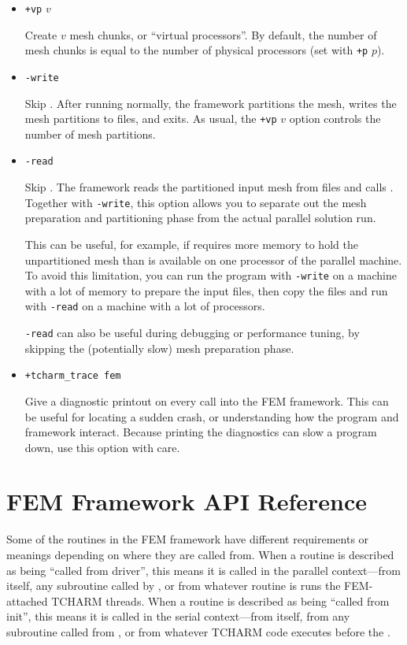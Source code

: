 \documentclass[10pt]{article}
\begin{document}
\begin{itemize}
\item {\tt +vp} $v$  

Create $v$ mesh chunks, or ``virtual processors''.
By default, the number of mesh chunks is equal to the number of 
physical processors (set with {\tt +p} $p$).


\item {\tt -write}

Skip .
After running  normally, the framework partitions the mesh, 
writes the mesh partitions to files, and exits.  As usual, the
{\tt +vp} $v$ option controls the number of mesh partitions.


\item {\tt -read}

Skip .
The framework reads the partitioned input mesh from files
and calls .  Together with {\tt -write}, this option
allows you to separate out the mesh preparation and partitioning 
phase from the actual parallel solution run.

This can be useful, for example, if  requires more memory 
to hold the unpartitioned mesh than is available on one processor of 
the parallel machine.  To avoid this limitation, you can run the program
with {\tt -write} on a machine with a lot of memory to prepare the input
files, then copy the files and run with {\tt -read} on a machine with 
a lot of processors.

{\tt -read} can also be useful during debugging or performance tuning, 
by skipping the (potentially slow) mesh preparation phase.


\item {\tt +tcharm\_trace fem}

Give a diagnostic printout on every call into the FEM framework.
This can be useful for locating a sudden crash, or understanding
how the program and framework interact.  Because printing the 
diagnostics can slow a program down, use this option with care.

\end{itemize}


\section{FEM Framework API Reference}

Some of the routines in the FEM framework have different requirements or meanings
depending on where they are called from.  When a routine is described
as being ``called from driver'', this means it is called in the parallel
context---from  itself, any subroutine called by ,
or from whatever routine is runs the FEM-attached TCHARM threads.
When a routine is described as being ``called from init'', this means it is 
called in the serial context---from  itself, from any subroutine
called from , or from whatever TCHARM code executes before the
.
\end{document}
